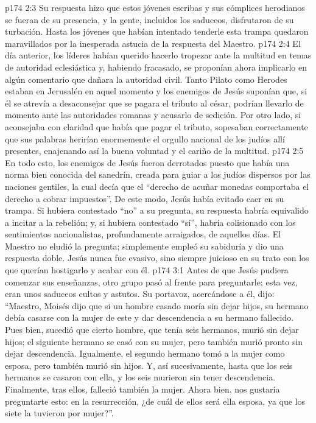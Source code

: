 \vs p174 2:3 Su respuesta hizo que estos jóvenes escribas y sus cómplices herodianos se fueran de su presencia, y la gente, incluidos los saduceos, disfrutaron de su turbación. Hasta los jóvenes que habían intentado tenderle esta trampa quedaron maravillados por la inesperada astucia de la respuesta del Maestro.
\vs p174 2:4 El día anterior, los líderes habían querido hacerlo tropezar ante la multitud en temas de autoridad eclesiástica y, habiendo fracasado, se proponían ahora implicarlo en algún comentario que dañara la autoridad civil. Tanto Pilato como Herodes estaban en Jerusalén en aquel momento y los enemigos de Jesús suponían que, si él se atrevía a desaconsejar que se pagara el tributo al césar, podrían llevarlo de momento ante las autoridades romanas y acusarlo de sedición. Por otro lado, si aconsejaba con claridad que había que pagar el tributo, sopesaban correctamente que sus palabras herirían enormemente el orgullo nacional de los judíos allí presentes, enajenando así la buena voluntad y el cariño de la multitud.
\vs p174 2:5 En todo esto, los enemigos de Jesús fueron derrotados puesto que había una norma bien conocida del sanedrín, creada para guiar a los judíos dispersos por las naciones gentiles, la cual decía que el “derecho de acuñar monedas comportaba el derecho a cobrar impuestos”. De este modo, Jesús había evitado caer en su trampa. Si hubiera contestado “no” a su pregunta, su respuesta habría equivalido a incitar a la rebelión; y, si hubiera contestado “sí”, habría colisionado con los sentimientos nacionalistas, profundamente arraigados, de aquellos días. El Maestro no eludió la pregunta; simplemente empleó su sabiduría y dio una respuesta doble. Jesús nunca fue evasivo, sino siempre juicioso en su trato con los que querían hostigarlo y acabar con él.
\vs p174 3:1 Antes de que Jesús pudiera comenzar sus enseñanzas, otro grupo pasó al frente para preguntarle; esta vez, eran unos saduceos cultos y astutos. Su portavoz, acercándose a él, dijo: “Maestro, Moisés dijo que si un hombre casado moría sin dejar hijos, su hermano debía casarse con la mujer de este y dar descendencia a su hermano fallecido. Pues bien, sucedió que cierto hombre, que tenía seis hermanos, murió sin dejar hijos; el siguiente hermano se casó con su mujer, pero también murió pronto sin dejar descendencia. Igualmente, el segundo hermano tomó a la mujer como esposa, pero también murió sin hijos. Y, así sucesivamente, hasta que los seis hermanos se casaron con ella, y los seis murieron sin tener descendencia. Finalmente, tras ellos, falleció también la mujer. Ahora bien, nos gustaría preguntarte esto: en la resurrección, ¿de cuál de ellos será ella esposa, ya que los siete la tuvieron por mujer?”.
